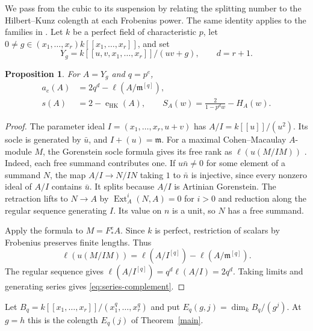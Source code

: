 \documentclass[11pt,a4paper,reqno]{amsart}
\numberwithin{equation}{section}
\theoremstyle{plain}
\newtheorem{proposition}[theorem]{Proposition}
\newcommand{\m}{\mathfrak m}
\newcommand{\eHK}{\operatorname{e}_{\mathrm{HK}}}
\begin{document}
We pass from the cubic to its suspension by relating the splitting number to the Hilbert--Kunz colength at each Frobenius power. The same identity applies to the families in \cite{companion}. Let $k$ be a perfect field of characteristic $p$, let $0\ne g\in(x_1,\ldots,x_r)k[[x_1,\ldots,x_r]]$, and set
\[
 Y_g=k[[u,v,x_1,\ldots,x_r]]/(uv+g),\qquad d=r+1 .
\]

\begin{proposition}\label{prop:complement}
For $A=Y_g$ and $q=p^e$,
\begin{align}
 a_e(A)&=2q^d-\ell(A/\m^{[q]}),\label{eq:finite-complement}\\
 s(A)&=2-\eHK(A),\qquad
 S_A(w)=\frac{2}{1-p^d w}-H_A(w).\label{eq:series-complement}
\end{align}
\end{proposition}
\begin{proof}
The parameter ideal $I=(x_1,\ldots,x_r,u+v)$ has $A/I=k[[u]]/(u^2)$. Its socle is generated by $\bar u$, and $I+(u)=\m$. For a maximal Cohen--Macaulay $A$-module $M$, the Gorenstein socle formula gives its free rank as $\ell(u(M/IM))$ \cite[proof of Theorem~11(2)]{HL02}. Indeed, each free summand contributes one. If $u\bar n\ne0$ for some element of a summand $N$, the map $A/I\to N/IN$ taking $1$ to $\bar n$ is injective, since every nonzero ideal of $A/I$ contains $\bar u$. It splits because $A/I$ is Artinian Gorenstein. The retraction lifts to $N\to A$ by $\operatorname{Ext}_A^i(N,A)=0$ for $i>0$ and reduction along the regular sequence generating $I$. Its value on $n$ is a unit, so $N$ has a free summand.

Apply the formula to $M=F_*^eA$. Since $k$ is perfect, restriction of scalars by Frobenius preserves finite lengths. Thus
\[
 \ell(u(M/IM))=\ell(A/I^{[q]})-\ell(A/\m^{[q]}).
\]
The regular sequence gives $\ell(A/I^{[q]})=q^d\ell(A/I)=2q^d$. Taking limits and generating series gives \eqref{eq:series-complement}.
\end{proof}

Let $B_q=k[[x_1,\ldots,x_r]]/(x_1^q,\ldots,x_r^q)$ and put $E_q(g,j)=\dim_k B_q/(g^j)$. At $g=h$ this is the colength $E_q(j)$ of Theorem~\ref{main}.
\end{document}
